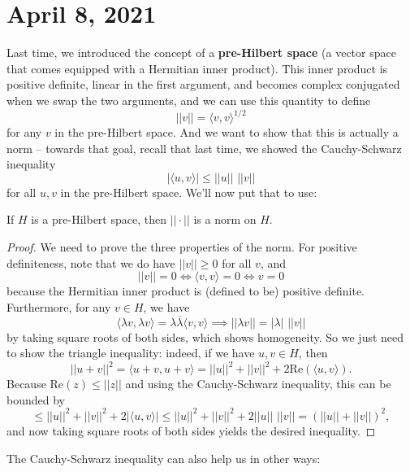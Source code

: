 \pagebreak\section*{April 8, 2021}

Last time, we introduced the concept of a \textbf{pre-Hilbert space} (a vector space that comes equipped with a Hermitian inner product). This inner product is positive definite, linear in the first argument, and becomes complex conjugated when we swap the two arguments, and we can use this quantity to define 
\[
    ||v|| = \langle v, v \rangle^{1/2}
\]  
for any $v$ in the pre-Hilbert space. And we want to show that this is actually a norm -- towards that goal, recall that last time, we showed the Cauchy-Schwarz inequality
\[
    |\langle u, v \rangle| \le ||u|| \,\, ||v||
\]
for all $u, v$ in the pre-Hilbert space. We'll now put that to use:

\begin{theorem}
If $H$ is a pre-Hilbert space, then $||\cdot||$ is a norm on $H$.
\end{theorem}
\begin{proof}
We need to prove the three properties of the norm. For positive definiteness, note that we do have $||v|| \ge 0$ for all $v$, and
\[
    ||v|| = 0 \iff \langle v, v \rangle = 0 \iff v = 0
\]
because the Hermitian inner product is (defined to be) positive definite. Furthermore, for any $v \in H$, we have 
\[
    \langle \lambda v, \lambda v \rangle = \lambda \overline{\lambda} \langle v, v \rangle \implies ||\lambda v|| = |\lambda| \,\, ||v||
\]
by taking square roots of both sides, which shows homogeneity. So we just need to show the triangle inequality: indeed, if we have $u, v \in H$, then 
\[
    \boxed{||u+v||^2} = \langle u + v, u + v \rangle = ||u||^2 + ||v||^2 + 2 \text{Re}(\langle u, v \rangle).
\]
Because $\text{Re}(z) \le ||z||$ and using the Cauchy-Schwarz inequality, this can be bounded by 
\[
    \le ||u||^2 + ||v||^2 + 2|\langle u, v \rangle| \le ||u||^2 + ||v||^2 + 2||u||\,\,||v|| = \boxed{(||u|| + ||v||)^2},
\]
and now taking square roots of both sides yields the desired inequality. 
\end{proof}

The Cauchy-Schwarz inequality can also help us in other ways:

